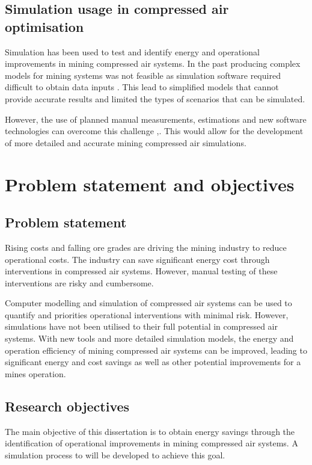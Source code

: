 	\subsection{Simulation usage in compressed air optimisation}
		Simulation has been used to test and identify energy and operational improvements in mining compressed air systems. In the past producing complex models for mining systems was not feasible as simulation software required difficult to obtain data inputs \cite{marais2013simplification}. This lead to simplified models that cannot provide accurate results and limited the types of scenarios that can be simulated. 
		\par 
		However, the use of planned manual measurements, estimations and new software technologies can overcome this challenge \cite{Bredenkamp2015Challeges},\cite{Mare2017Evaluating}. This would allow for the development of more detailed and accurate mining compressed air simulations.

\section{Problem statement and objectives}
	\subsection{Problem statement}
 		Rising costs and falling ore grades are driving the mining industry to reduce operational costs. The industry can save significant energy cost through interventions in compressed air systems. However, manual testing of these interventions are risky and cumbersome.
 		\par
 		Computer modelling and simulation of compressed air systems can be used to quantify and priorities operational interventions with minimal risk. However, simulations have not been utilised to their full potential in compressed air systems. With new tools and more detailed simulation models, the energy and operation efficiency of mining compressed air systems can be improved, leading to significant energy and cost savings as well as other potential improvements for a mines operation.
	\subsection{Research objectives}
		The main objective of this dissertation is to obtain energy savings through the identification of operational improvements in mining compressed air systems. A simulation process to will be developed to achieve this goal.
